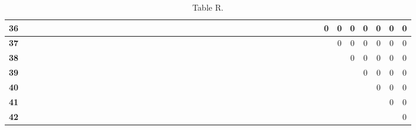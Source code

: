 \documentclass{article}
\begin{document}
\begin{table}[!ht]
\begin{adjustwidth}{-3cm}{-3cm}
\begin{tabular}{c||c|c|c|c|c|c|c|c|c|c|c|c|c|c|c|c|c|c|c|c|c|c|c|c|c|c|c|c|c|c|c|c|c|c|c|c|c|c|c|c|c|c|c|}
\multicolumn{1}{|c||}{\cellcolor{gray90}\textbf{36}} &  &  &  &  &  &  &  &  &  &  &  &  &  &  &  &  &  &  &  &  &  &  &  &  &  &  &  &  &  &  &  &  &  &  &  &  & 0 & 0 & 0 & 0 & 0 & 0 & 0 \\ \hline
\multicolumn{1}{|c||}{\cellcolor{gray90}\textbf{37}} &  &  &  &  &  &  &  &  &  &  &  &  &  &  &  &  &  &  &  &  &  &  &  &  &  &  &  &  &  &  &  &  &  &  &  &  &  & 0 & 0 & 0 & 0 & 0 & 0 \\ \hline
\multicolumn{1}{|c||}{\cellcolor{gray90}\textbf{38}} &  &  &  &  &  &  &  &  &  &  &  &  &  &  &  &  &  &  &  &  &  &  &  &  &  &  &  &  &  &  &  &  &  &  &  &  &  &  & 0 & 0 & 0 & 0 & 0 \\ \hline
\multicolumn{1}{|c||}{\cellcolor{gray90}\textbf{39}} &  &  &  &  &  &  &  &  &  &  &  &  &  &  &  &  &  &  &  &  &  &  &  &  &  &  &  &  &  &  &  &  &  &  &  &  &  &  &  & 0 & 0 & 0 & 0 \\ \hline
\multicolumn{1}{|c||}{\cellcolor{gray90}\textbf{40}} &  &  &  &  &  &  &  &  &  &  &  &  &  &  &  &  &  &  &  &  &  &  &  &  &  &  &  &  &  &  &  &  &  &  &  &  &  &  &  &  & 0 & 0 & 0 \\ \hline
\multicolumn{1}{|c||}{\cellcolor{gray90}\textbf{41}} &  &  &  &  &  &  &  &  &  &  &  &  &  &  &  &  &  &  &  &  &  &  &  &  &  &  &  &  &  &  &  &  &  &  &  &  &  &  &  &  &  & 0 & 0 \\ \hline
\multicolumn{1}{|c||}{\cellcolor{gray90}\textbf{42}} &  &  &  &  &  &  &  &  &  &  &  &  &  &  &  &  &  &  &  &  &  &  &  &  &  &  &  &  &  &  &  &  &  &  &  &  &  &  &  &  &  &  & 0 \\ \hline
\end{tabular}
\caption{Table R.}
\end{adjustwidth}
\end{table}
\end{document}
